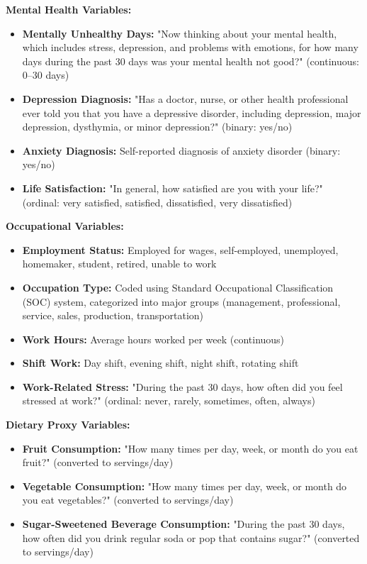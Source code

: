\documentclass[journal,twoside,10pt]{IEEEtran}
\begin{document}
\textbf{Mental Health Variables:}
\begin{itemize}
\item \textbf{Mentally Unhealthy Days:} "Now thinking about your mental health, which includes stress, depression, and problems with emotions, for how many days during the past 30 days was your mental health not good?" (continuous: 0--30 days)
\item \textbf{Depression Diagnosis:} "Has a doctor, nurse, or other health professional ever told you that you have a depressive disorder, including depression, major depression, dysthymia, or minor depression?" (binary: yes/no)
\item \textbf{Anxiety Diagnosis:} Self-reported diagnosis of anxiety disorder (binary: yes/no)
\item \textbf{Life Satisfaction:} "In general, how satisfied are you with your life?" (ordinal: very satisfied, satisfied, dissatisfied, very dissatisfied)
\end{itemize}

\textbf{Occupational Variables:}
\begin{itemize}
\item \textbf{Employment Status:} Employed for wages, self-employed, unemployed, homemaker, student, retired, unable to work
\item \textbf{Occupation Type:} Coded using Standard Occupational Classification (SOC) system, categorized into major groups (management, professional, service, sales, production, transportation)
\item \textbf{Work Hours:} Average hours worked per week (continuous)
\item \textbf{Shift Work:} Day shift, evening shift, night shift, rotating shift
\item \textbf{Work-Related Stress:} "During the past 30 days, how often did you feel stressed at work?" (ordinal: never, rarely, sometimes, often, always)
\end{itemize}

\textbf{Dietary Proxy Variables:}
\begin{itemize}
\item \textbf{Fruit Consumption:} "How many times per day, week, or month do you eat fruit?" (converted to servings/day)
\item \textbf{Vegetable Consumption:} "How many times per day, week, or month do you eat vegetables?" (converted to servings/day)
\item \textbf{Sugar-Sweetened Beverage Consumption:} "During the past 30 days, how often did you drink regular soda or pop that contains sugar?" (converted to servings/day)
\end{itemize}
\end{document}
